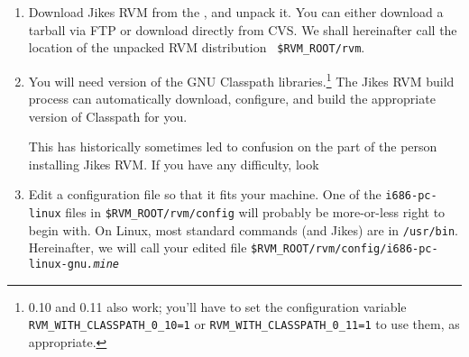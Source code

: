 \begin{enumerate}
We have had mixed experiences with different releases of the Jikes
compiler. Versions 1.13 and 1.18 are known to work for building Jikes
RVM. Versions 1.14 through 1.17, 1.20, 1.21, and 1.22 are known {\em not}\/ to
work.  Version 1.19 has worked for many people, but we have had
problems reported on OSX. 


\begin{small}
{\tt jikes-1.15} in
particular --- installed by default with SuSE Linux 8.1 --- has a
byte-code generation bug that will cause Jikes RVM to crash with an
{\tt ArrayIndexOutOfBounds} exception.  Jikes 1.21 and 1.22 dump core
with an assertion failure when they builds Jikes RVM.

{\tt jikes-1.13}, as of the last
time we tried it (September 28, 2004) works fine, and sometimes generates
better error messages than {\tt jikes-1.18} and {\tt jikes-1.19}.
\end{small}

\item Download Jikes RVM from the , and unpack it.   You can either
  download a tarball via FTP or download directly from CVS.  We shall
hereinafter call the location of the unpacked RVM distribution {\tt
  \$RVM\_\-ROOT\-/\-rvm}.   


%
%
\item You will need version \classpathversion{} of the GNU
Classpath libraries.\footnote{0.10 and 0.11 also work; you'll have to
  set the configuration variable {\tt RVM\_WITH\_CLASSPATH\_0\_10=1} or
  {\tt RVM\_WITH\_CLASSPATH\_0\_11=1} to use them, as appropriate.}
The Jikes RVM build process can automatically download, 
configure, and build the appropriate version of Classpath for you.

This has historically sometimes led to confusion on the part of the
person installing Jikes RVM.\@  
If you have any difficulty, look \AtManualClasspathRootDiscussion{}

\item Edit a configuration file so that it fits your machine.  One of
the {\tt i686-pc-linux} files in {\tt \$RVM\_\-ROOT/rvm/config} will probably be
more-or-less right to begin with.  On Linux, most standard commands
(and Jikes) are in {\tt /usr/bin}.  Hereinafter, we will call your edited
file {\tt \$RVM\_\-ROOT/rvm/config/i686-pc-linux-gnu{\it .mine}}


\end{enumerate}
